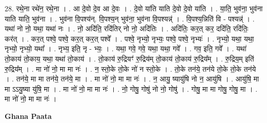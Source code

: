 \documentclass[17pt]{extarticle}
\begin{document}
28. रथे॒ना रथे॑न॒ रथे॒ना । . आ दे॒वो दे॒व आ दे॒वः । . दे॒वो या॑ति याति दे॒वो दे॒वो या॑ति । . या॒ति॒ भुव॑ना॒ भुव॑ना याति याति॒ भुव॑ना । . भुव॑ना वि॒पश्य॑न्. वि॒पश्य॒न् भुव॑ना॒ भुव॑ना वि॒पश्यन्न्॑ । . वि॒पश्य॒न्निति॑ वि - पश्यन्न्॑ । . यथा॑ नो नो॒ यथा॒ यथा॑ नः । . नो॒ अदि॑ति॒ रदि॑तिर् नो नो॒ अदि॑तिः । . अदि॑तिः॒ कर॒त् कर॒ ददि॑ति॒ रदि॑तिः॒ कर॑त् । . कर॒त् पश्वे॒ पश्वे॒ कर॒त् कर॒त् पश्वे᳚ । . पश्वे॒ नृभ्यो॒ नृभ्यः॒ पश्वे॒ पश्वे॒ नृभ्यः॑ । . नृभ्यो॒ यथा॒ यथा॒ नृभ्यो॒ नृभ्यो॒ यथा᳚ । . नृभ्य॒ इति॒ नृ - भ्यः॒ । . यथा॒ गवे॒ गवे॒ यथा॒ यथा॒ गवे᳚ । . गव॒ इति॒ गवे᳚ । . यथा॑ तो॒काय॑ तो॒काय॒ यथा॒ यथा॑ तो॒काय॑ । . तो॒काय॑ रु॒द्रियꣳ॑ रु॒द्रिय॑म् तो॒काय॑ तो॒काय॑ रु॒द्रिय᳚म् । . रु॒द्रिय॒म् इति॑ रु॒द्रिय᳚म् । . मा नो॑ नो॒ मा मा नः॑ । . न॒ स्तो॒के तो॒के नो॑ न स्तो॒के । . तो॒के तन॑ये॒ तन॑ये तो॒के तो॒के तन॑ये । . तन॑ये॒ मा मा तन॑ये॒ तन॑ये॒ मा । . मा नो॑ नो॒ मा मा नः॑ । . न॒ आयु॒ ष्यायु॑षि नो न॒ आयु॑षि । . आयु॑षि॒ मा मा ऽऽयु॒ष्या यु॑षि॒ मा । . मा नो॑ नो॒ मा मा नः॑ । . नो॒ गोषु॒ गोषु॑ नो नो॒ गोषु॑ । . गोषु॒ मा मा गोषु॒ गोषु॒ मा । . मा नो॑ नो॒ मा मा नः॑ । \newline

\textbf{Ghana Paata } \newline
\end{document}

